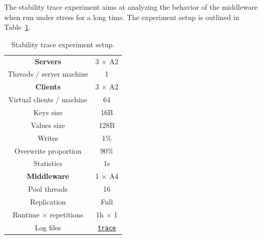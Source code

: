 \documentclass[11pt]{article}
\theoremstyle{definition}
\renewcommand\b[1]{{\bf{#1}}}
\renewcommand\t\texttt
\begin{document}
The stability trace experiment aims at analyzing the behavior of the middleware when run under stress for a long time.
The experiment setup is outlined in Table~\ref{tab:exp2}.

\begin{table}[!h]
    \centering
    \small{
        \smallskip
        \begin{tabular}{|c|c|}
            \hline \b{Servers} & 3 $\times$ A2 \\ 
            {Threads / server machine} & 1 \\ 
            \hline\hline \b{Clients} & 3 $\times$ A2 \\ 
            {Virtual clients / machine} &  64 \\ 
            {Keys size} & 16B \\
            {Values size} & 128B \\
            {Writes} & 1\% \\
            {Overwrite proportion} & 90\% \\
            {Statistics} & 1s \\
            \hline\hline \b{Middleware} & 1 $\times$ A4 \\ 
            {Pool threads} & 16 \\ 
            {Replication} & Full \\ 
            \hline\hline {Runtime $\times$ repetitions} & 1h $\times$ 1 \\ 
            {Log files} & \hyperref[f:trace]{\t{trace}} \\
            \hline 
        \end{tabular} }
        \caption{Stability trace experiment setup.}
        \label{tab:exp2}
    \end{table}

\end{document}
